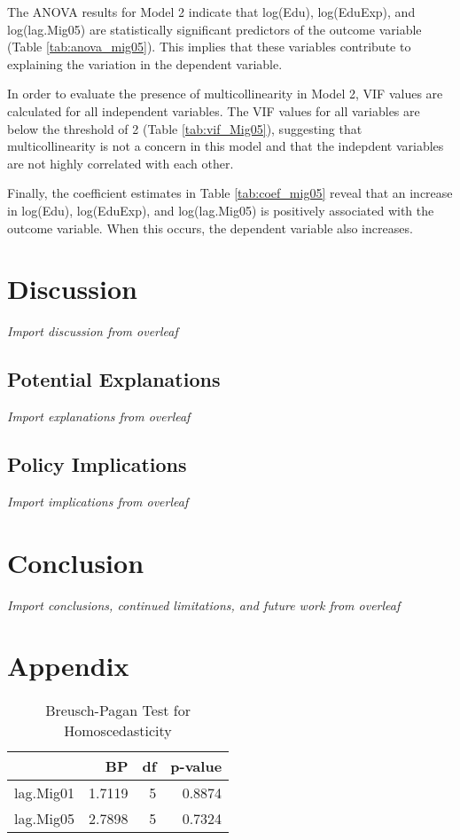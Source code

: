 \documentclass[12pt]{article}
\newcommand{\pointer}[1]{{\color{red} \center \textit{#1}}}
\begin{document}
The ANOVA results for Model 2 indicate that log(Edu), log(EduExp), and log(lag.Mig05) are statistically significant predictors of the outcome variable (Table \ref{tab:anova_mig05}).
This implies that these variables contribute to explaining the variation in the dependent variable.

In order to evaluate the presence of multicollinearity in Model 2, VIF values are calculated for all independent variables.
The VIF values for all variables are below the threshold of 2 (Table \ref{tab:vif_Mig05}), suggesting that multicollinearity is not a concern in this model and that the indepdent variables are not highly correlated with each other.

Finally, the coefficient estimates in Table \ref{tab:coef_mig05} reveal that an increase in log(Edu), log(EduExp), and log(lag.Mig05) is positively associated with the outcome variable.
When this occurs, the dependent variable also increases.



\section{Discussion} \label{discussion}
\pointer{Import discussion from overleaf}
\subsection{Potential Explanations}
\pointer{Import explanations from overleaf}
\subsection{Policy Implications}
\pointer{Import implications from overleaf}
\section{Conclusion} \label{conclusion}
\pointer{Import conclusions, continued limitations, and future work  from overleaf}
\section{Appendix} \label{appendix}
\begin{table}[H]
    \centering
    \begin{tabular}{lrrr}
        \hline
                  & BP     & df & p-value \\
        \hline
        lag.Mig01 & 1.7119 & 5  & 0.8874  \\
        lag.Mig05 & 2.7898 & 5  & 0.7324  \\
        \hline
    \end{tabular}
    \caption{Breusch-Pagan Test for Homoscedasticity}
    \label{tab:bptest}
\end{table}
\end{document}
